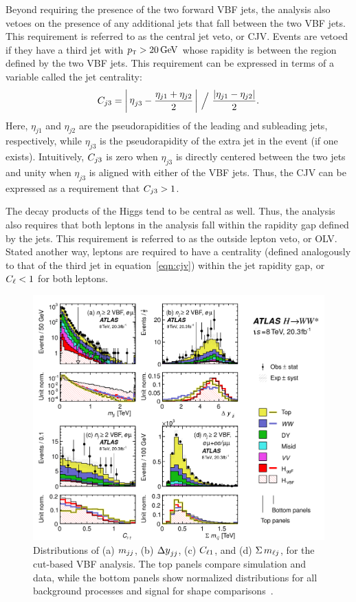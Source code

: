 Beyond requiring the presence of the two forward VBF jets, the analysis also vetoes on the presence of any additional jets that fall between the two VBF jets. This requirement is referred to as the central jet veto, or CJV. Events are vetoed if they have a third jet with $\pT > 20 \GeV$ whose rapidity is between the region defined by the two VBF jets. This requirement can be expressed in terms of a variable called the jet centrality:
%
\begin{equation}
\cjv = \bigg|\, \etathirdjet - \frac{\eta_{j1} + \eta_{j2}}{2} \,\bigg|\ \Big/\ \frac{\left|\eta_{j1} - \eta_{j2}\right|}{2}.
\label{eqn:cjv}
\end{equation}
%
Here, $\eta_{j1}$ and $\eta_{j2}$ are the pseudorapidities of the leading and subleading jets, respectively, while $\eta_{j3}$ is the pseudorapidity of the extra jet in the event (if one exists). Intuitively, $C_{j3}$ is zero when $\eta_{j3}$ is directly centered between the two jets and unity when $\eta_{j3}$ is aligned with either of the VBF jets. Thus, the CJV can be expressed as a requirement that $C_{j3} > 1$. 

The decay products of the Higgs tend to be central as well. Thus, the analysis also requires that both leptons in the analysis fall within the rapidity gap defined by the jets. This requirement is referred to as the outside lepton veto, or OLV. Stated another way, leptons are required to have a centrality (defined analogously to that of the third jet in equation~\ref{eqn:cjv}) within the jet rapidity gap, or $C_{\ell} < 1$ for both leptons. 

\begin{figure}
  \centering
  \captionsetup{justification=centering}
  \includegraphics[width=\textwidth]{figures/VBF_vars}
  \caption{Distributions of (a) $m_{jj}$, (b) $\dyjj$, (c) $C_{\ell1}$, and (d) $\Sigma\,m_{\ell j}$, for the cut-based VBF analysis. The top panels compare simulation and data, while the bottom panels show normalized distributions for all background processes and signal for shape comparisons~\cite{WW2015}.}
  \label{fig:vbfvars}
\end{figure}

